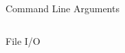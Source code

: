 \documentclass[10pt]{beamer}
\begin{document}
\begin{frame}{Command Line Arguments}
\begin{columns}[c]
  \begin{column}{0.5\textwidth}
    
  \end{column}
  \begin{column}{0.5\textwidth}
    
  \end{column}
\end{columns}
\end{frame}


\begin{frame}{File I/O}
\begin{columns}[c]
  \begin{column}{0.5\textwidth}
    
  \end{column}
  \begin{column}{0.5\textwidth}
    
  \end{column}
\end{columns}
\end{frame}
\end{document}
